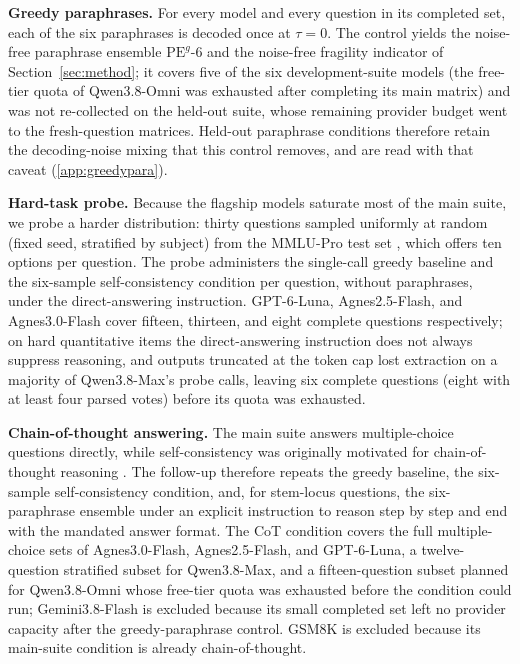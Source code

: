 \textbf{Greedy paraphrases.} For every model and every question in its completed set, each of the six paraphrases is decoded once at $\tau = 0$. The control yields the noise-free paraphrase ensemble $\mathrm{PE}^{g}\text{-}6$ and the noise-free fragility indicator of Section~\ref{sec:method}; it covers five of the six development-suite models (the free-tier quota of Qwen3.8-Omni was exhausted after completing its main matrix) and was not re-collected on the held-out suite, whose remaining provider budget went to the fresh-question matrices. Held-out paraphrase conditions therefore retain the decoding-noise mixing that this control removes, and are read with that caveat (\ref{app:greedypara}).

\textbf{Hard-task probe.} Because the flagship models saturate most of the main suite, we probe a harder distribution: thirty questions sampled uniformly at random (fixed seed, stratified by subject) from the MMLU-Pro test set \citep{wang2024mmlupro}, which offers ten options per question. The probe administers the single-call greedy baseline and the six-sample self-consistency condition per question, without paraphrases, under the direct-answering instruction. GPT-6-Luna, Agnes2.5-Flash, and Agnes3.0-Flash cover fifteen, thirteen, and eight complete questions respectively; on hard quantitative items the direct-answering instruction does not always suppress reasoning, and outputs truncated at the token cap lost extraction on a majority of Qwen3.8-Max's probe calls, leaving six complete questions (eight with at least four parsed votes) before its quota was exhausted.

\textbf{Chain-of-thought answering.} The main suite answers multiple-choice questions directly, while self-consistency was originally motivated for chain-of-thought reasoning \citep{wei2022chain,wang2023selfconsistency}. The follow-up therefore repeats the greedy baseline, the six-sample self-consistency condition, and, for stem-locus questions, the six-paraphrase ensemble under an explicit instruction to reason step by step and end with the mandated answer format. The CoT condition covers the full multiple-choice sets of Agnes3.0-Flash, Agnes2.5-Flash, and GPT-6-Luna, a twelve-question stratified subset for Qwen3.8-Max, and a fifteen-question subset planned for Qwen3.8-Omni whose free-tier quota was exhausted before the condition could run; Gemini3.8-Flash is excluded because its small completed set left no provider capacity after the greedy-paraphrase control. GSM8K is excluded because its main-suite condition is already chain-of-thought.

